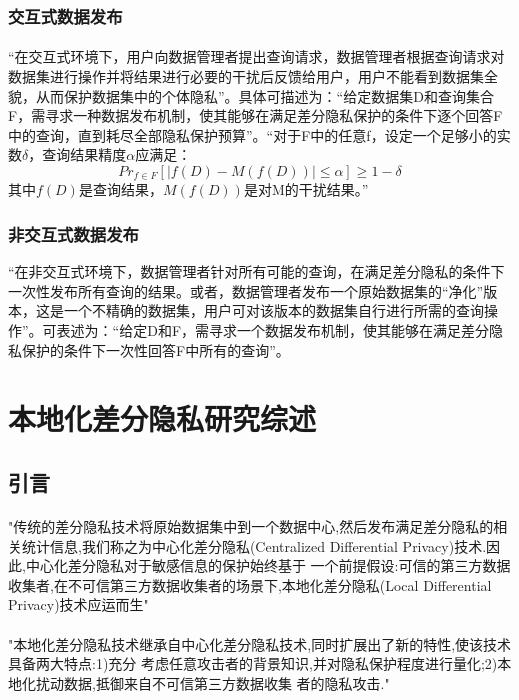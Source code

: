 \documentclass[12pt,a4paper]{article}
\begin{document}
\subsubsection{交互式数据发布}
\paragraph{} “在交互式环境下，用户向数据管理者提出查询请求，数据管理者根据查询请求对数据集进行操作并将结果进行必要的干扰后反馈给用户，用户不能看到数据集全貌，从而保护数据集中的个体隐私”。具体可描述为：“给定数据集D和查询集合F，需寻求一种数据发布机制，使其能够在满足差分隐私保护的条件下逐个回答F中的查询，直到耗尽全部隐私保护预算”。“对于F中的任意f，设定一个足够小的实数$\delta$，查询结果精度$\alpha$应满足：
\begin{equation}
	Pr_{f\in F}[|f(D)-M(f(D))|\leq \alpha]\geq 1-\delta
\end{equation}
其中$f(D)$是查询结果，$M(f(D))$是对M的干扰结果。”
\subsubsection{非交互式数据发布} “在非交互式环境下，数据管理者针对所有可能的查询，在满足差分隐私的条件下一次性发布所有查询的结果。或者，数据管理者发布一个原始数据集的“净化”版本，这是一个不精确的数据集，用户可对该版本的数据集自行进行所需的查询操作”。可表述为：“给定D和F，需寻求一个数据发布机制，使其能够在满足差分隐私保护的条件下一次性回答F中所有的查询”。

\section{本地化差分隐私研究综述\cite{2018本地化差分隐私研究综述}}
\subsection{引言}
\paragraph{} "传统的差分隐私技术将原始数据集中到一个数据中心,然后发布满足差分隐私的相关统计信息,我们称之为中心化差分隐私(Centralized Differential Privacy)技术.因此,中心化差分隐私对于敏感信息的保护始终基于 一个前提假设:可信的第三方数据收集者,在不可信第三方数据收集者的场景下,本地化差分隐私(Local Differential Privacy)技术应运而生"
\paragraph{} "本地化差分隐私技术继承自中心化差分隐私技术,同时扩展出了新的特性,使该技术具备两大特点:1)充分 考虑任意攻击者的背景知识,并对隐私保护程度进行量化;2)本地化扰动数据,抵御来自不可信第三方数据收集 者的隐私攻击."
\end{document}
